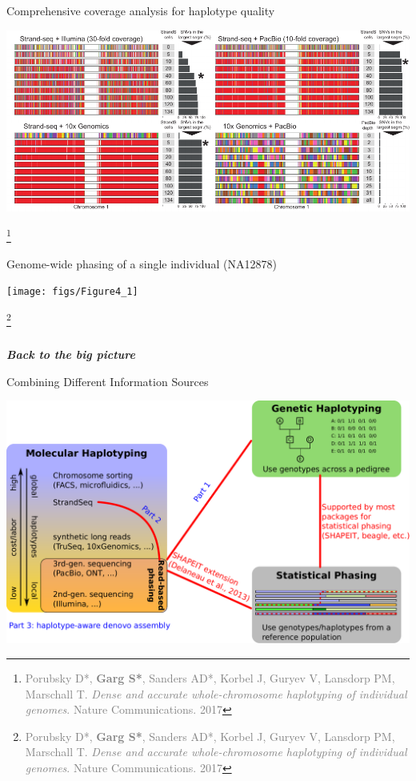 \documentclass[notes=hide]{beamer}
\newcommand{\captionslide}[1]{
\begin{frame}
\frametitle{\phantom{NONE}}
\begin{center}
\vspace{1cm}
\usebeamerfont{Largefont}
          {\bf\em #1}
          \vspace{2cm}
\end{center}
\end{frame}
}
\begin{document}
\begin{frame}{Comprehensive coverage analysis for haplotype quality}
\begin{center}
\includegraphics[width=\textwidth]{figs/Figure3_2}
\end{center}
\let\thefootnote\relax\footnote{\tiny\textcolor{gray}{Porubsky D*, \textbf{Garg S*}, Sanders AD*, Korbel J, Guryev V, Lansdorp PM, Marschall T. \textit{Dense and accurate whole-chromosome haplotyping of individual genomes}. Nature Communications. 2017}}

\end{frame}



\begin{frame}{Genome-wide phasing of a single individual (NA12878)}
\begin{center}
\texttt{[image: figs/Figure4\_1]}
\end{center}
\let\thefootnote\relax\footnote{\tiny\textcolor{gray}{Porubsky D*, \textbf{Garg S*}, Sanders AD*, Korbel J, Guryev V, Lansdorp PM, Marschall T. \textit{Dense and accurate whole-chromosome haplotyping of individual genomes}. Nature Communications. 2017}}

\end{frame}

\captionslide{Back to the big picture}

\begin{frame}{Combining Different Information Sources}
	\begin{center}
		\includegraphics[width=\textwidth]{figs/haplotyping-overview-connections7}
	\end{center}
\end{frame}
\end{document}
